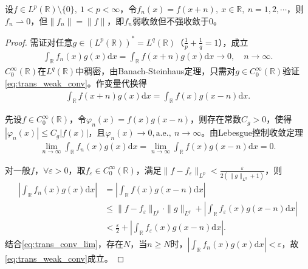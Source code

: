 \documentclass[../../main.tex]{subfiles}%
\begin{document}
\begin{example}[平移型弱收敛]

设$f\in L^p(\mathbb{R})\setminus\{0\},\ 1<p<\infty$，令$f_n(x)=f(x+n),\ x\in\mathbb{R},\ n=1,2,\cdots$，则$f_n\rightharpoonup0$，但$\|f_n\|=\|f\|$，即$f_n$弱收敛但不强收敛于$0$。
\end{example}
\begin{proof}

需证对任意$g\in(L^p(\mathbb{R}))^*=L^q(\mathbb{R})$（$\frac{1}{p}+\frac{1}{q}=1$），成立
\begin{align}
\int_{\mathbb{R}}f_n(x)g(x)\mathrm{d}x=\int_{\mathbb{R}}f(x+n)g(x)\mathrm{d}x\to0,\quad n\to\infty.\label{eq:trans_weak_conv}
\end{align}
$C_0^\infty(\mathbb{R})$在$L^q(\mathbb{R})$中稠密，由Banach-Steinhaus定理，只需对$g\in C_0^\infty(\mathbb{R})$验证\eqref{eq:trans_weak_conv}。作变量代换得
\begin{align*}
\int_{\mathbb{R}}f(x+n)g(x)\mathrm{d}x=\int_{\mathbb{R}}f(x)g(x-n)\mathrm{d}x.
\end{align*}

先设$f\in C_0^\infty(\mathbb{R})$，令$\varphi_n(x)=f(x)g(x-n)$，则存在常数$C_g>0$，使得$|\varphi_n(x)|\leqslant C_g|f(x)|$，且$\varphi_n(x)\to0,\text{a.e.},\ n\to\infty$。由Lebesgue控制收敛定理
\begin{align}
\lim\limits_{n\to\infty}\int_{\mathbb{R}}f_n(x)g(x)\mathrm{d}x=\lim\limits_{n\to\infty}\int_{\mathbb{R}}f(x)g(x-n)\mathrm{d}x=0.\label{eq:trans_conv_lim}
\end{align}

对一般$f$，$\forall\varepsilon>0$，取$f_\varepsilon\in C_0^\infty(\mathbb{R})$，满足$\|f-f_\varepsilon\|_{L^p}<\frac{\varepsilon}{2(\|g\|_{L^q}+1)}$，则
\begin{align*}
\left|\int_{\mathbb{R}}f_n(x)g(x)\mathrm{d}x\right|&=\left|\int_{\mathbb{R}}f(x)g(x-n)\mathrm{d}x\right|\\
&\leqslant\|f-f_\varepsilon\|_{L^p}\cdot\|g\|_{L^q}+\left|\int_{\mathbb{R}}f_\varepsilon(x)g(x-n)\mathrm{d}x\right|\\
&<\frac{\varepsilon}{2}+\left|\int_{\mathbb{R}}f_\varepsilon(x)g(x-n)\mathrm{d}x\right|.
\end{align*}
结合\eqref{eq:trans_conv_lim}，存在$N$，当$n\geqslant N$时，$\left|\int_{\mathbb{R}}f_n(x)g(x)\mathrm{d}x\right|<\varepsilon$，故\eqref{eq:trans_weak_conv}成立。

\end{proof}
\end{document}
